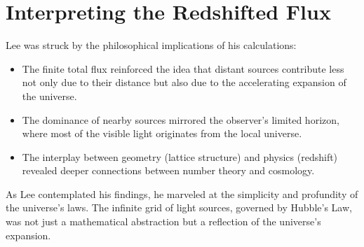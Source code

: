 % 
% 
% 
% 
% 
% 
% 
% 
% 
\section*{Interpreting the Redshifted Flux}
Lee was struck by the philosophical implications of his calculations:
\begin{itemize}
    \item The finite total flux reinforced the idea that distant sources contribute less not only due to their distance but also due to the accelerating expansion of the universe.
    \item The dominance of nearby sources mirrored the observer’s limited horizon, where most of the visible light originates from the local universe.
    \item The interplay between geometry (lattice structure) and physics (redshift) revealed deeper connections between number theory and cosmology.
\end{itemize}

As Lee contemplated his findings, he marveled at the simplicity and profundity of the universe’s laws. The infinite grid of light sources, governed by Hubble’s Law, was not just a mathematical abstraction but a reflection of the universe’s expansion.
